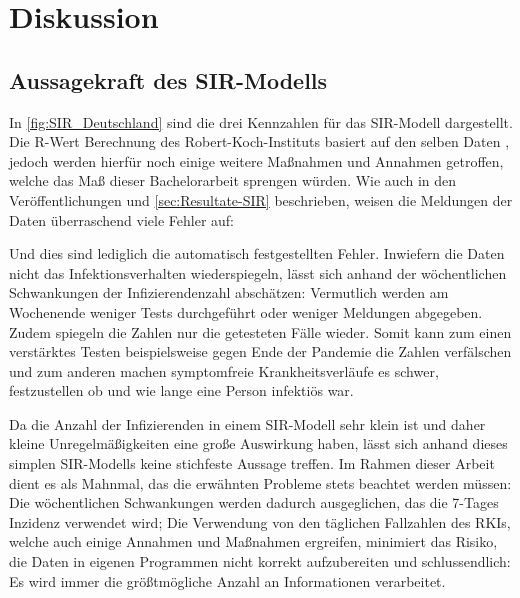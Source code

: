 \chapter{Diskussion}\label{chap:Diskussion}
\section{Aussagekraft des SIR-Modells}
In \autoref{fig:SIR_Deutschland} sind die drei Kennzahlen für das SIR-Modell dargestellt. Die R-Wert Berechnung des Robert-Koch-Instituts basiert auf den selben Daten \autocite{fig:RKI}, jedoch werden hierfür noch einige weitere Maßnahmen und Annahmen getroffen, welche das Maß dieser Bachelorarbeit sprengen würden.
Wie auch in den Veröffentlichungen und \autoref{sec:Resultate-SIR} beschrieben, weisen die Meldungen der Daten überraschend viele Fehler auf: 

Und dies sind lediglich die automatisch festgestellten Fehler. Inwiefern die Daten nicht das Infektionsverhalten wiederspiegeln, lässt sich anhand der wöchentlichen Schwankungen der Infizierendenzahl abschätzen: Vermutlich werden am Wochenende weniger Tests durchgeführt oder weniger Meldungen abgegeben. 
Zudem spiegeln die Zahlen nur die getesteten Fälle wieder. Somit kann zum einen verstärktes Testen beispielsweise gegen Ende der Pandemie die Zahlen verfälschen und zum anderen machen symptomfreie Krankheitsverläufe es schwer, festzustellen ob und wie lange eine Person infektiös war.

Da die Anzahl der Infizierenden in einem SIR-Modell sehr klein ist und daher kleine Unregelmäßigkeiten eine große Auswirkung haben, lässt sich anhand dieses simplen SIR-Modells keine stichfeste Aussage treffen.
Im Rahmen dieser Arbeit dient es als Mahnmal, das die erwähnten Probleme stets beachtet werden müssen:
Die wöchentlichen Schwankungen werden dadurch ausgeglichen, das die 7-Tages Inzidenz verwendet wird; Die Verwendung von den täglichen Fallzahlen des RKIs, welche auch einige Annahmen und Maßnahmen ergreifen, minimiert das Risiko, die Daten in eigenen Programmen nicht korrekt aufzubereiten und schlussendlich: Es wird immer die größtmögliche Anzahl an Informationen verarbeitet.

